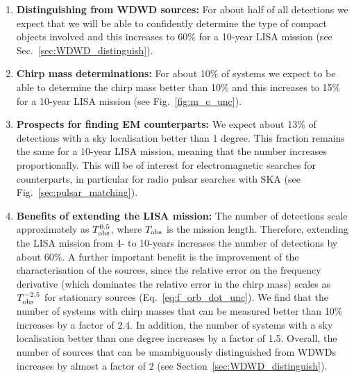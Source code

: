 \begin{enumerate}
    \item \textbf{Distinguishing from WDWD sources:} For about half of all detections we expect that we will be able to confidently determine the type of compact objects involved and this increases to 60\% for a 10-year LISA mission (see Sec.~\ref{sec:WDWD_distinguish}).
    
    \item \textbf{Chirp mass determinations:} For about 10\% of systems we expect to be able to determine the chirp mass better than 10\% and this increases to 15\% for a 10-year LISA mission (see Fig.~\ref{fig:m_c_unc}).
    
    
    \item \textbf{Prospects for finding EM counterparts:} We expect about 13\% of detections with a sky localisation better than 1 degree. This fraction remains the same for a 10-year LISA mission, meaning that the number increases proportionally.
    This will be of interest for electromagnetic searches for counterparts, in particular for radio pulsar searches with SKA (see Fig.~\ref{sec:pulsar_matching}).
 
   \item \textbf{Benefits of extending the LISA mission:} The number of detections scale approximately as $T_{\rm obs}^{0.5}$, where $T_{\rm obs}$ is the mission length. Therefore, extending the LISA mission from 4- to 10-years increases the number of detections by about 60\%.
   A further important benefit is the improvement of the characterisation of the sources, since the relative error on the frequency derivative (which dominates the relative error in the chirp mass) scales as $T_{\rm obs}^{-2.5}$ for stationary sources (Eq.~\ref{eq:f_orb_dot_unc}).
   We find that the number of systems with chirp masses that can be measured better than 10\% increases by a factor of 2.4.
   In addition, the number of systems with a sky localisation better than one degree increases by a factor of 1.5.
   Overall, the number of sources that can be unambiguously distinguished from WDWDs increases by almost a factor of 2 (see Section~\ref{sec:WDWD_distinguish}).
\end{enumerate}